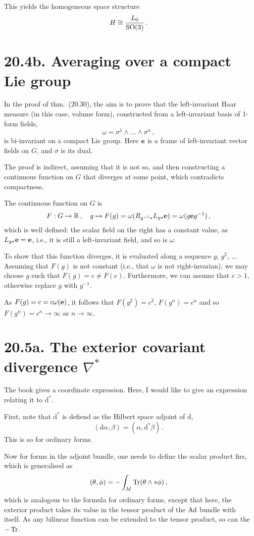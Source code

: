 \documentclass[a4paper,12pt]{article}
\def\d{\mathrm{d}}
\def\Tr{\ensuremath{\mathop{\rm Tr}}}
\begin{document}
This yields the homogeneous space structure
\[
 H \cong \frac{L_0}{{\rm SO}(3)}\,.
\]


\section*{20.4b. Averaging over a compact Lie group}

In the proof of thm.\ (20.30), the aim is to prove that the left-invariant Haar measure (in this case, volume form), constructed from a left-invariant basis of 1-form fields,
\[
 \omega = \sigma^1 \wedge \dots \wedge \sigma^n\,,
\]
is bi-invariant on a compact Lie group. Here ${\bf e}$ is a frame of left-invariant vector fields on $G$, and $\sigma$ is its dual.

The proof is indirect, assuming that it is not so, and then constructing a continuous function on $G$ that diverges at some point, which contradicts compactness.

The continuous function on $G$ is
\[
 F:G\to\mathbb{R}\,,\quad g\mapsto F(g)= \omega(R_{g^{-1}*}L_{g*}{\bf e}) = \omega(g{\bf e}g^{-1})\,,
\]
which is well defined: the scalar field on the right has a constant value, as $L_{g*}{\bf e}={\bf e}$, i.e., it is still a left-invariant field, and so is $\omega$.

To show that this function diverges, it is evaluated along a sequence $g$, $g^2$, \dots. Assuming that $F(g)$ is not constant (i.e., that $\omega$  is not right-invarian), we may choose $g$ such that $F(g) = c\ne F(e)$. Furthermore, we can assume that $c>1$, otherwise replace $g$ with $g^{-1}$. 

As $F(g) = c = c \omega({\bf e})$, it follows that $F(g^2) = c^2$, $F(g^n)=c^n$ and so $F(g^n)=c^n \to \infty$ as $n\to\infty$.

\section*{20.5a. The exterior covariant divergence $\nabla^*$}
The book gives a coordinate expression. Here, I would like to give an expression relating it to $\d^*$.

First, note that $\d^*$ is defiend as the Hilbert space adjoint of $\d$,
\[
 (\d \alpha, \beta) = (\alpha, \d^* \beta)\,.
\]
This is so for ordinary forms.

Now for forms in the adjoint bundle, one needs to define the scalar product firs, which is generalised as
\[
 (\theta, \phi) = -\int_M \Tr (\theta \wedge * \phi)\,,
\]
which is analogous to the formula for ordinary forms, except that here, the exterior product takes its value in the tensor product of the ${\rm Ad}$ bundle with itself. As any bilinear function can be extended to the tensor product, so can the $-\Tr$.
\end{document}

